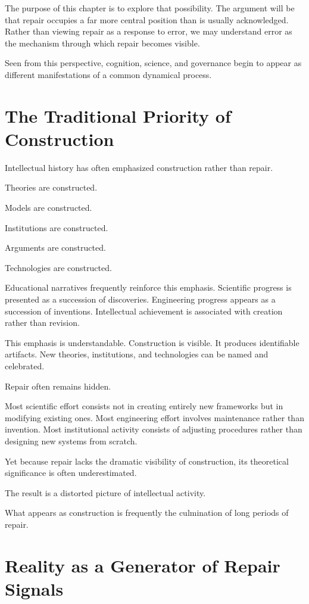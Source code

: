 \documentclass[11pt,oneside,openany]{book}
\begin{document}
The purpose of this chapter is to explore that possibility. The argument will be that repair occupies a far more central position than is usually acknowledged. Rather than viewing repair as a response to error, we may understand error as the mechanism through which repair becomes visible.

Seen from this perspective, cognition, science, and governance begin to appear as different manifestations of a common dynamical process.

\section{The Traditional Priority of Construction}

Intellectual history has often emphasized construction rather than repair.

Theories are constructed.

Models are constructed.

Institutions are constructed.

Arguments are constructed.

Technologies are constructed.

Educational narratives frequently reinforce this emphasis. Scientific progress is presented as a succession of discoveries. Engineering progress appears as a succession of inventions. Intellectual achievement is associated with creation rather than revision.

This emphasis is understandable. Construction is visible. It produces identifiable artifacts. New theories, institutions, and technologies can be named and celebrated.

Repair often remains hidden.

Most scientific effort consists not in creating entirely new frameworks but in modifying existing ones. Most engineering effort involves maintenance rather than invention. Most institutional activity consists of adjusting procedures rather than designing new systems from scratch.

Yet because repair lacks the dramatic visibility of construction, its theoretical significance is often underestimated.

The result is a distorted picture of intellectual activity.

What appears as construction is frequently the culmination of long periods of repair.

\section{Reality as a Generator of Repair Signals}
\end{document}
